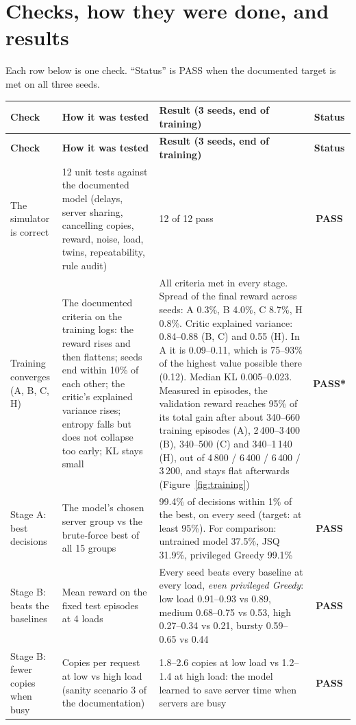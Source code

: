 \documentclass[10pt,a4paper]{article}
\newcommand{\pass}{{\sffamily\bfseries\color{acc}PASS}}
\newcommand{\note}{{\sffamily\bfseries\color{warn}PASS*}}
\newcommand{\hdr}[1]{\textsf{\textbf{#1}}}
\begin{document}
\clearpage
\section{Checks, how they were done, and results}\label{sec:results}
Each row below is one check. ``Status'' is PASS when the documented target is met on all three seeds.

\begingroup\small
\setlength{\LTpre}{2pt}\setlength{\LTpost}{2pt}
\begin{xltabular}{\textwidth}{@{}P{3.3cm}LL C@{}}
\toprule
\hdr{Check} & \hdr{How it was tested} & \hdr{Result (3 seeds, end of training)} & \hdr{Status}\\\midrule
\endfirsthead
\toprule
\hdr{Check} & \hdr{How it was tested} & \hdr{Result (3 seeds, end of training)} & \hdr{Status}\\\midrule
\endhead
The simulator is correct & 12 unit tests against the documented model (delays, server sharing, cancelling copies, reward, noise, load, twins, repeatability, rule audit) & 12 of 12 pass & \pass\\
Training converges (A, B, C, H) & The documented criteria on the training logs: the reward rises and then flattens; seeds end within 10\% of each other; the critic's explained variance rises; entropy falls but does not collapse too early; KL stays small & All criteria met in every stage. Spread of the final reward across seeds: A 0.3\%, B 4.0\%, C 8.7\%, H 0.8\%. Critic explained variance: 0.84--0.88 (B, C) and 0.55 (H). In A it is 0.09--0.11, which is 75--93\% of the highest value possible there (0.12). Median KL 0.005--0.023. Measured in episodes, the validation reward reaches 95\% of its total gain after about 340--660 training episodes (A), 2\,400--3\,400 (B), 340--500 (C) and 340--1\,140 (H), out of 4\,800 / 6\,400 / 6\,400 / 3\,200, and stays flat afterwards (Figure~\ref{fig:training}) & \note\\
Stage A: best decisions & The model's chosen server group vs the brute-force best of all 15 groups & 99.4\% of decisions within 1\% of the best, on every seed (target: at least 95\%). For comparison: untrained model 37.5\%, JSQ 31.9\%, privileged Greedy 99.1\% & \pass\\
Stage B: beats the baselines & Mean reward on the fixed test episodes at 4 loads & Every seed beats every baseline at every load, \emph{even privileged Greedy}: low load 0.91--0.93 vs 0.89, medium 0.68--0.75 vs 0.53, high 0.27--0.34 vs 0.21, bursty 0.59--0.65 vs 0.44 & \pass\\
Stage B: fewer copies when busy & Copies per request at low vs high load (sanity scenario 3 of the documentation) & 1.8--2.6 copies at low load vs 1.2--1.4 at high load: the model learned to save server time when servers are busy & \pass\\

\end{xltabular}
\end{document}
